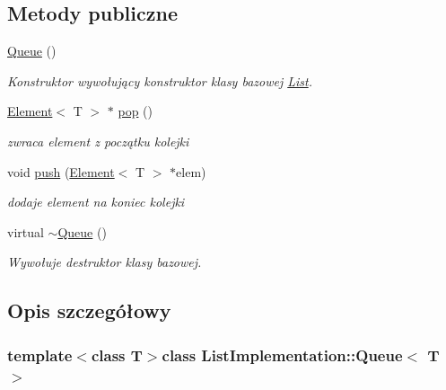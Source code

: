 \subsection*{Metody publiczne}
\begin{DoxyCompactItemize}
\item 
\hypertarget{class_list_implementation_1_1_queue_acc4029f7302ff7285eb04a95617fc280}{\hyperlink{class_list_implementation_1_1_queue_acc4029f7302ff7285eb04a95617fc280}{Queue} ()}\label{class_list_implementation_1_1_queue_acc4029f7302ff7285eb04a95617fc280}

\begin{DoxyCompactList}\small\item\em Konstruktor wywołujący konstruktor klasy bazowej \hyperlink{class_list_implementation_1_1_list}{List}. \end{DoxyCompactList}\item 
\hyperlink{class_element}{Element}$<$ T $>$ $\ast$ \hyperlink{class_list_implementation_1_1_queue_a8860612212b3ab036b2032dc1ee0cb63}{pop} ()
\begin{DoxyCompactList}\small\item\em zwraca element z początku kolejki \end{DoxyCompactList}\item 
void \hyperlink{class_list_implementation_1_1_queue_a4b4439f3c97e53691620787cf2847cdc}{push} (\hyperlink{class_element}{Element}$<$ T $>$ $\ast$elem)
\begin{DoxyCompactList}\small\item\em dodaje element na koniec kolejki \end{DoxyCompactList}\item 
\hypertarget{class_list_implementation_1_1_queue_ab7c68be079c746681443aa0b06075f24}{virtual \hyperlink{class_list_implementation_1_1_queue_ab7c68be079c746681443aa0b06075f24}{$\sim$\-Queue} ()}\label{class_list_implementation_1_1_queue_ab7c68be079c746681443aa0b06075f24}

\begin{DoxyCompactList}\small\item\em Wywołuje destruktor klasy bazowej. \end{DoxyCompactList}\end{DoxyCompactItemize}


\subsection{Opis szczegółowy}
\subsubsection*{template$<$class T$>$class List\-Implementation\-::\-Queue$<$ T $>$}

